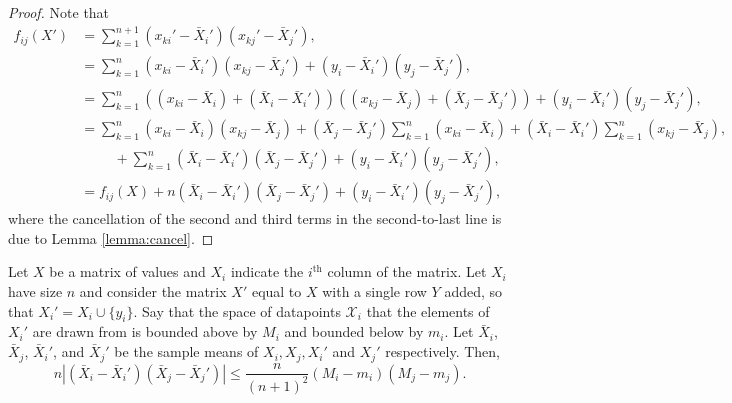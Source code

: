 \documentclass[11pt]{scrartcl} %
\begin{document}
\begin{proof}
Note that
\begin{align*}
f_{ij}(X') &= \sum_{k=1}^{n+1} (x_{ki}' - \bar{X}_i')(x_{kj}' - \bar{X}_j'),\\
	&= \sum_{k=1}^{n} (x_{ki} - \bar{X}_i')(x_{kj} - \bar{X}_j') + (y_i - \bar{X}_i')(y_j - \bar{X}_j'),\\
	&= \sum_{k=1}^{n} \left( (x_{ki} - \bar{X}_i )+ (\bar{X}_i - \bar{X}_i' )\right) \left( (x_{kj} - \bar{X}_j )+ (\bar{X}_j - \bar{X}_j') \right) + (y_i - \bar{X}_i')(y_j - \bar{X}_j'),\\
	&= \sum_{k=1}^{n} (x_{ki} - \bar{X}_i)(x_{kj} - \bar{X}_j) + (\bar{X}_j - \bar{X}_j')\sum_{k=1}^{n} (x_{ki}-\bar{X}_i) + (\bar{X}_i - \bar{X}_i') \sum_{k=1}^{n} (x_{kj} - \bar{X}_j),\\
	& \hspace{1cm} + \sum_{k=1}^{n} (\bar{X}_i - \bar{X}_i')(\bar{X}_j - \bar{X}_j') + (y_i - \bar{X}_i')(y_j - \bar{X}_j'),\\
	&= f_{ij}(X) + n(\bar{X}_i - \bar{X}_i')(\bar{X}_j - \bar{X}_j') + (y_i - \bar{X}_i')(y_j - \bar{X}_j'),
\end{align*}
where the cancellation of the second and third terms in the second-to-last line is due to Lemma \ref{lemma:cancel}.
\end{proof}

\begin{lemma}
\label{lemma:term1bound}
Let $X$ be a matrix of values and $X_i$ indicate the $i^{\text{th}}$ column of the matrix. Let  $X_i$ have size $n$ and consider the matrix $X'$ equal to $X$ with a single row $Y$ added, so that $X_i' = X_i \cup \{y_i\}$. Say that the space of datapoints $\mathcal{X}_i$ that the elements of $X_i'$ are drawn from is bounded above by $M_i$ and bounded below by $m_i$. Let  $\bar{X}_i$, $\bar{X}_j$, $\bar{X}_i'$, and $\bar{X}_j'$ be the sample means of $X_i, X_j, X_i'$ and $X_j'$ respectively. Then,
$$ n \left\vert (\bar{X}_i - \bar{X}_i')(\bar{X}_j - \bar{X}_j') \right\vert \le \frac{n}{(n+1)^2}(M_i - m_i)(M_j - m_j).$$
\end{lemma}
\end{document}

